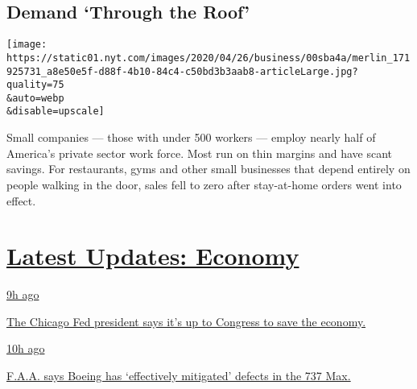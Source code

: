 \hypertarget{demand-through-the-roof}{%
\subsection{Demand `Through the Roof'}\label{demand-through-the-roof}}

\texttt{[image: https://static01.nyt.com/images/2020/04/26/business/00sba4a/merlin\_171925731\_a8e50e5f-d88f-4b10-84c4-c50bd3b3aab8-articleLarge.jpg?quality=75\\\&auto=webp\\\&disable=upscale]}

Small companies --- those with under 500 workers --- employ nearly half
of America's private sector work force. Most run on thin margins and
have scant savings. For restaurants, gyms and other small businesses
that depend entirely on people walking in the door, sales fell to zero
after stay-at-home orders went into effect.

\hypertarget{latest-updates-economy}{%
\section{\texorpdfstring{\href{https://www.nytimes.com/live/2020/08/03/business/stock-market-today-coronavirus?action=click\&pgtype=Article\&state=default\&region=MAIN_CONTENT_1\&context=storylines_live_updates}{Latest
Updates:
Economy}}{Latest Updates: Economy}}\label{latest-updates-economy}}

\href{https://www.nytimes.com/live/2020/08/03/business/stock-market-today-coronavirus?action=click\&pgtype=Article\&state=default\&region=MAIN_CONTENT_1\&context=storylines_live_updates\#the-chicago-fed-president-says-its-up-to-congress-to-save-the-economy}{9h
ago}

\href{https://www.nytimes.com/live/2020/08/03/business/stock-market-today-coronavirus?action=click\&pgtype=Article\&state=default\&region=MAIN_CONTENT_1\&context=storylines_live_updates\#the-chicago-fed-president-says-its-up-to-congress-to-save-the-economy}{The
Chicago Fed president says it's up to Congress to save the economy.}

\href{https://www.nytimes.com/live/2020/08/03/business/stock-market-today-coronavirus?action=click\&pgtype=Article\&state=default\&region=MAIN_CONTENT_1\&context=storylines_live_updates\#faa-says-boeing-has-effectively-mitigated-defects-in-the-737-max}{10h
ago}

\href{https://www.nytimes.com/live/2020/08/03/business/stock-market-today-coronavirus?action=click\&pgtype=Article\&state=default\&region=MAIN_CONTENT_1\&context=storylines_live_updates\#faa-says-boeing-has-effectively-mitigated-defects-in-the-737-max}{F.A.A.
says Boeing has `effectively mitigated' defects in the 737 Max.}

